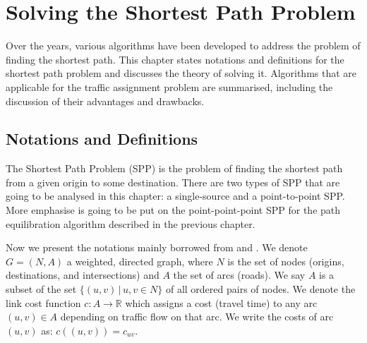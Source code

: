 \chapter{Solving the Shortest Path Problem}
\label{chap:solvingspp}

Over the years,
various algorithms have been developed 
to address the problem of finding the shortest path.
This chapter states notations and definitions for the shortest path problem and discusses
the theory of solving it.
Algorithms that are applicable for the traffic assignment problem are summarised,
including the discussion of their advantages and drawbacks.

\section{Notations and Definitions}
The Shortest Path Problem (SPP) is the problem of finding the shortest path from a given origin  to some destination.
There are two types of SPP that are going to
be analysed in this chapter:
a single-source and a point-to-point SPP.  
More emphasise is going to be put on the point-point-point SPP for the path equilibration algorithm described in the previous chapter.


Now we present the notations mainly borrowed from \citet{Cormen} and \citet{Klunder}.
We denote $ G = ( N, A ) $ a weighted, directed graph,
where $ N $ is the set of nodes (origins, destinations, and intersections)
and $ A $ the set of arcs (roads).
We say $ A $ is a subset of the set $ \{ (u, v)\, | \, u, v \in N \} $ of all ordered pairs of nodes.
We denote the link cost function $ c : A \rightarrow \mathbb{R} $ which assigns a cost (travel time) to any arc $ (u,v) \in A $ depending on traffic flow on that arc.
We write the costs of arc $(u, v)$ as: $ c((u, v)) = c_{uv} $.

